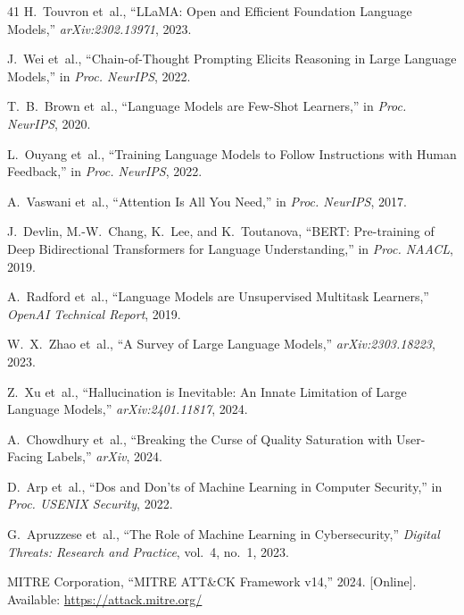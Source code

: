 \documentclass[journal]{IEEEtran}
\begin{document}
\begin{thebibliography}{41}
H.~Touvron et~al., ``LLaMA: Open and Efficient Foundation Language Models,'' \emph{arXiv:2302.13971}, 2023.

J.~Wei et~al., ``Chain-of-Thought Prompting Elicits Reasoning in Large Language Models,'' in \emph{Proc. NeurIPS}, 2022.

T.~B.~Brown et~al., ``Language Models are Few-Shot Learners,'' in \emph{Proc. NeurIPS}, 2020.

L.~Ouyang et~al., ``Training Language Models to Follow Instructions with Human Feedback,'' in \emph{Proc. NeurIPS}, 2022.

A.~Vaswani et~al., ``Attention Is All You Need,'' in \emph{Proc. NeurIPS}, 2017.

J.~Devlin, M.-W.~Chang, K.~Lee, and K.~Toutanova, ``BERT: Pre-training of Deep Bidirectional Transformers for Language Understanding,'' in \emph{Proc. NAACL}, 2019.

A.~Radford et~al., ``Language Models are Unsupervised Multitask Learners,'' \emph{OpenAI Technical Report}, 2019.

W.~X.~Zhao et~al., ``A Survey of Large Language Models,'' \emph{arXiv:2303.18223}, 2023.

Z.~Xu et~al., ``Hallucination is Inevitable: An Innate Limitation of Large Language Models,'' \emph{arXiv:2401.11817}, 2024.

A.~Chowdhury et~al., ``Breaking the Curse of Quality Saturation with User-Facing Labels,'' \emph{arXiv}, 2024.

D.~Arp et~al., ``Dos and Don'ts of Machine Learning in Computer Security,'' in \emph{Proc. USENIX Security}, 2022.

G.~Apruzzese et~al., ``The Role of Machine Learning in Cybersecurity,'' \emph{Digital Threats: Research and Practice}, vol.~4, no.~1, 2023.

MITRE Corporation, ``MITRE ATT\&CK Framework v14,'' 2024. [Online]. Available: \url{https://attack.mitre.org/}


\end{thebibliography}
\end{document}
